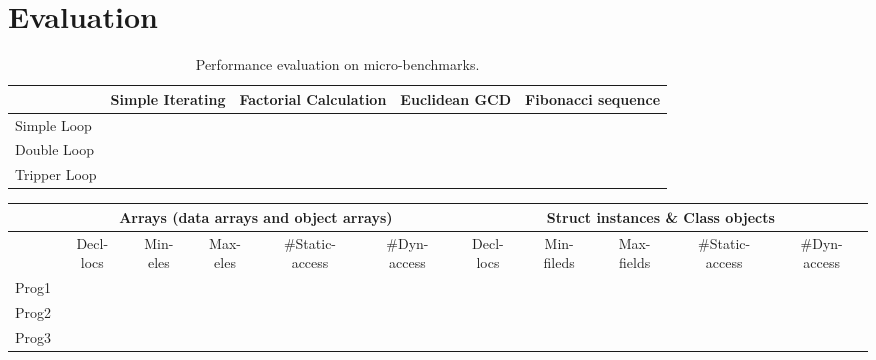 \section{Evaluation}


\begin{table}[tp]
    \begin{tabular}{|l|l|l|l|l|}
        \hline
                     & Simple Iterating & Factorial Calculation & Euclidean GCD & Fibonacci sequence \\ \hline
        Simple Loop  &                  &                       &               &                    \\ \hline
        Double Loop  &                  &                       &               &                    \\ \hline
        Tripper Loop &                  &                       &               &                    \\ \hline
    \end{tabular}
    \caption{Performance evaluation on micro-benchmarks.}
\end{table}


\begin{table*}[]
    \begin{tabular}{|c|c|c|c|c|c|c|c|c|c|c|}
        \hline
              & \multicolumn{5}{c|}{Arrays (data arrays and object arrays)} & \multicolumn{5}{c|}{Struct instances \& Class objects}                                                                                                                    \\ \hline
              & Decl-locs                                                   & Min-eles                                               & Max-eles & \#Static-access & \#Dyn-access & Decl-locs & Min-fileds & Max-fields & \#Static-access & \#Dyn-access \\ \hline
        Prog1 &                                                             &                                                        &          &                 &              &           &            &            &                 &              \\ \hline
        Prog2 &                                                             &                                                        &          &                 &              &           &            &            &                 &              \\ \hline
        Prog3 &                                                             &                                                        &          &                 &              &           &            &            &                 &              \\ \hline
    \end{tabular}
\end{table*}
